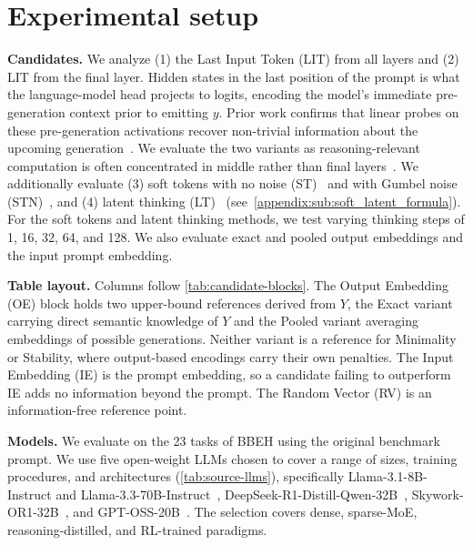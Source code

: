 \section{Experimental setup}
\label{sec:exp_setup}

\textbf{Candidates.} We analyze (1) the Last Input Token (LIT) from all layers and (2) LIT from the final layer. Hidden states in the last position of the prompt is what the language-model head projects to logits, encoding the model's immediate pre-generation context prior to emitting $y$. Prior work confirms that linear probes on these pre-generation activations recover non-trivial information about the upcoming generation~\citep{lugoloobi2026llms}. We evaluate the two variants as reasoning-relevant computation is often concentrated in middle rather than final layers~\citep{cai2026tmlr}. We additionally evaluate (3) soft tokens with no noise (ST)~\citep{zhang2025softthinkingunlockingreasoning} and with Gumbel noise (STN)~\citep{wu2026llms}, and (4) latent thinking (LT)~\citep{zou2025latentcollaborationmultiagentsystems} (see~\cref{appendix:sub:soft_latent_formula}). For the soft tokens and latent thinking methods, we test varying thinking steps of 1, 16, 32, 64, and 128. We also evaluate exact and pooled output embeddings and the input prompt embedding.


\textbf{Table layout.} Columns follow \cref{tab:candidate-blocks}. The Output Embedding (OE) block holds two upper-bound references derived from $Y$, the Exact variant carrying direct semantic knowledge of $Y$ and the Pooled variant averaging embeddings of possible generations. Neither variant is a reference for Minimality or Stability, where output-based encodings carry their own penalties. The Input Embedding (IE) is the prompt embedding, so a candidate failing to outperform IE adds no information beyond the prompt. The Random Vector (RV) is an information-free reference point.


\textbf{Models.} We evaluate on the 23 tasks of BBEH \citep{kazemi2025bigbenchextrahard} using the original benchmark prompt. We use five open-weight LLMs chosen to cover a range of sizes, training procedures, and architectures (\cref{tab:source-llms}), specifically Llama-3.1-8B-Instruct and Llama-3.3-70B-Instruct~\citep{grattafiori2024llama3herdmodels}, DeepSeek-R1-Distill-Qwen-32B~\citep{deepseekai2025deepseekr1incentivizingreasoningcapability}, Skywork-OR1-32B~\citep{he2025skywork, skywork-or1-2025}, and GPT-OSS-20B~\citep{openai2025gptoss120bgptoss20bmodel}. The selection covers dense, sparse-MoE, reasoning-distilled, and RL-trained paradigms.

